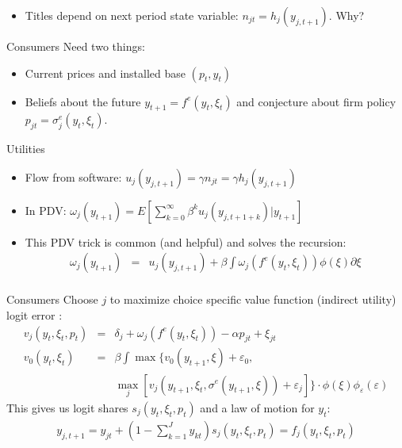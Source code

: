 \begin{frame}{}
\begin{itemize}
\item Titles depend on next period state variable: $n_{jt} = h_j(y_{j,t+1})$. Why?
\end{itemize}
\end{frame}

\begin{frame}{Consumers}
Need two things:
\begin{itemize}
\item Current prices and installed base $(p_t, y_t)$
\item Beliefs about the future $y_{t+1} = f^e(y_t,\xi_t)$ and conjecture about firm policy $p_{jt} = \sigma_j^e(y_t,\xi_t)$.
\end{itemize}
Utilities
\begin{itemize}
\item Flow from software: $u_j(y_{j,t+1}) = \gamma n_{jt} = \gamma h_j (y_{j,t+1})$
\item In PDV: $\omega_j (y_{t+1}) = E [ \sum_{k=0}^{\infty} \beta^k u_j(y_{j,t+1+k}) | y_{t+1}]$
\item This PDV trick is common (and helpful) and solves the recursion:
\begin{eqnarray*}
\omega_j(y_{t+1}) &=& u_j(y_{j,t+1}) + \beta \int  \omega_j( f^e(y_t,\xi_t)) \phi(\xi) \partial \xi\\
\end{eqnarray*}
\end{itemize}
\end{frame}

\begin{frame}{Consumers}
Choose $j$ to maximize choice specific value function (indirect utility) logit error :
\begin{eqnarray*}
v_j (y_t,\xi_t,p_t) &=& \delta_j + \omega_j( f^e(y_t,\xi_t)) - \alpha p_{jt} + \xi_{jt}\\
v_0(y_t,\xi_t) &=& \beta \int \max\{ v_0(y_{t+1},\xi) + \varepsilon_0, \\
&&  \max_j [v_j (y_{t+1},\xi_t,\sigma^e(y_{t+1},\xi)) + \varepsilon_j ] \} \cdot \phi(\xi) \phi_{\varepsilon}(\varepsilon)
\end{eqnarray*}
This gives us logit shares $s_j(y_{t},\xi_{t},p_t)$ and a law of motion for $y_{t}$:
\begin{eqnarray*}
y_{j,t+1} = y_{jt} + (1-\sum_{k=1}^J y_{kt}) s_j(y_t,\xi_t, p_t) = f_j (y_t, \xi_t, p_t)
\end{eqnarray*}
\end{frame}


